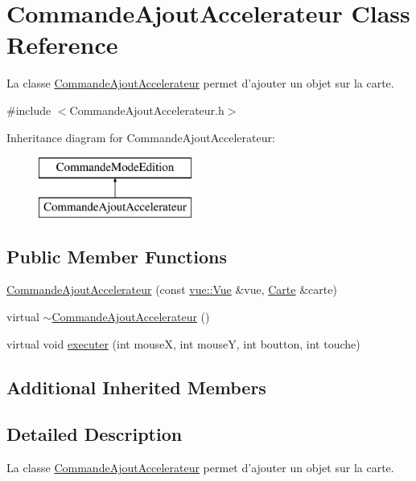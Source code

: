 \hypertarget{class_commande_ajout_accelerateur}{\section{Commande\-Ajout\-Accelerateur Class Reference}
\label{class_commande_ajout_accelerateur}
}


La classe \hyperlink{class_commande_ajout_accelerateur}{Commande\-Ajout\-Accelerateur} permet d'ajouter un objet sur la carte.  




{\ttfamily \#include $<$Commande\-Ajout\-Accelerateur.\-h$>$}

Inheritance diagram for Commande\-Ajout\-Accelerateur\-:\begin{figure}[H]
\begin{center}
\leavevmode
\includegraphics[height=2.000000cm]{class_commande_ajout_accelerateur}
\end{center}
\end{figure}
\subsection*{Public Member Functions}
\begin{DoxyCompactItemize}
\item 
\hyperlink{class_commande_ajout_accelerateur_a5deaad7144cbe48061677b59a8fca95c}{Commande\-Ajout\-Accelerateur} (const \hyperlink{classvue_1_1_vue}{vue\-::\-Vue} \&vue, \hyperlink{class_carte}{Carte} \&carte)
\item 
virtual \hyperlink{class_commande_ajout_accelerateur_ae5ecf61850b7ef9e3a482fc9baaaf3b1}{$\sim$\-Commande\-Ajout\-Accelerateur} ()
\item 
virtual void \hyperlink{class_commande_ajout_accelerateur_a1537ffad37fa05fa20cdbd414890adb3}{executer} (int mouse\-X, int mouse\-Y, int boutton, int touche)
\end{DoxyCompactItemize}
\subsection*{Additional Inherited Members}


\subsection{Detailed Description}
La classe \hyperlink{class_commande_ajout_accelerateur}{Commande\-Ajout\-Accelerateur} permet d'ajouter un objet sur la carte. 

